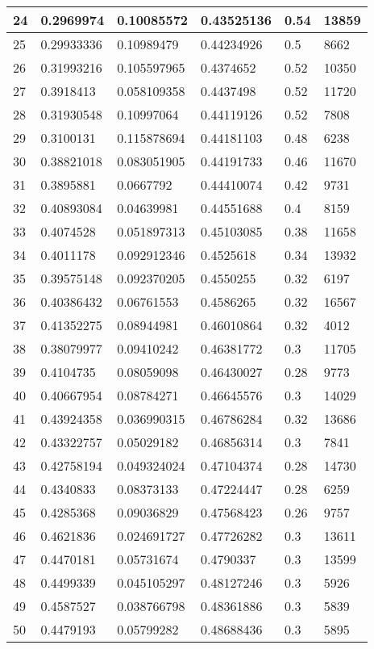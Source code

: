 \begin{longtable}{|l|l|l|l|l|l|}
24 & 0.2969974 & 0.10085572 & 0.43525136 & 0.54 & 13859 \\ \hline 
25 & 0.29933336 & 0.10989479 & 0.44234926 & 0.5 & 8662 \\ \hline 
26 & 0.31993216 & 0.105597965 & 0.4374652 & 0.52 & 10350 \\ \hline 
27 & 0.3918413 & 0.058109358 & 0.4437498 & 0.52 & 11720 \\ \hline 
28 & 0.31930548 & 0.10997064 & 0.44119126 & 0.52 & 7808 \\ \hline 
29 & 0.3100131 & 0.115878694 & 0.44181103 & 0.48 & 6238 \\ \hline 
30 & 0.38821018 & 0.083051905 & 0.44191733 & 0.46 & 11670 \\ \hline 
31 & 0.3895881 & 0.0667792 & 0.44410074 & 0.42 & 9731 \\ \hline 
32 & 0.40893084 & 0.04639981 & 0.44551688 & 0.4 & 8159 \\ \hline 
33 & 0.4074528 & 0.051897313 & 0.45103085 & 0.38 & 11658 \\ \hline 
34 & 0.4011178 & 0.092912346 & 0.4525618 & 0.34 & 13932 \\ \hline 
35 & 0.39575148 & 0.092370205 & 0.4550255 & 0.32 & 6197 \\ \hline 
36 & 0.40386432 & 0.06761553 & 0.4586265 & 0.32 & 16567 \\ \hline 
37 & 0.41352275 & 0.08944981 & 0.46010864 & 0.32 & 4012 \\ \hline 
38 & 0.38079977 & 0.09410242 & 0.46381772 & 0.3 & 11705 \\ \hline 
39 & 0.4104735 & 0.08059098 & 0.46430027 & 0.28 & 9773 \\ \hline 
40 & 0.40667954 & 0.08784271 & 0.46645576 & 0.3 & 14029 \\ \hline 
41 & 0.43924358 & 0.036990315 & 0.46786284 & 0.32 & 13686 \\ \hline 
42 & 0.43322757 & 0.05029182 & 0.46856314 & 0.3 & 7841 \\ \hline 
43 & 0.42758194 & 0.049324024 & 0.47104374 & 0.28 & 14730 \\ \hline 
44 & 0.4340833 & 0.08373133 & 0.47224447 & 0.28 & 6259 \\ \hline 
45 & 0.4285368 & 0.09036829 & 0.47568423 & 0.26 & 9757 \\ \hline 
46 & 0.4621836 & 0.024691727 & 0.47726282 & 0.3 & 13611 \\ \hline 
47 & 0.4470181 & 0.05731674 & 0.4790337 & 0.3 & 13599 \\ \hline 
48 & 0.4499339 & 0.045105297 & 0.48127246 & 0.3 & 5926 \\ \hline 
49 & 0.4587527 & 0.038766798 & 0.48361886 & 0.3 & 5839 \\ \hline 
50 & 0.4479193 & 0.05799282 & 0.48688436 & 0.3 & 5895 \\ \hline 
\end{longtable}